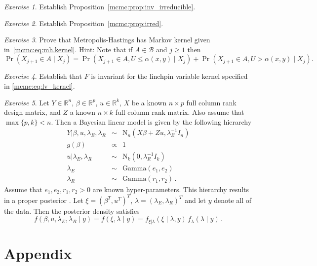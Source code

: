 \documentclass[12pt]{article}
\theoremstyle{plain}
\theoremstyle{definition}
\theoremstyle{remark}
\newtheorem{hw}{Exercise}[section]
\newcommand{\B}{\mathcal{B}}
\newcommand{\real}{\mathbb{R}}
\begin{document}
\begin{hw}
Establish Proposition~\ref{mcmc:prop:inv_irreducible}.
\end{hw}

\begin{hw}
  Establish Proposition~\ref{mcmc:prop:irred}.
\end{hw}

\begin{hw}
  Prove that Metropolis-Hastings  has Markov
  kernel given in~\eqref{mcmc:eq:mh.kernel}.  Hint: Note that if $A \in \B$
  and $j \ge 1$ then
  \[
    \Pr( X_{j+1} \in A \mid X_j) = \Pr(X_{j+1} \in A , U \le
    \alpha(x, y) \mid X_j) +  \Pr(X_{j+1} \in A , U >
    \alpha(x, y) \mid X_j) .
    \]
  \end{hw}


  \begin{hw}
    Establish that $F$ is invariant for  the linchpin variable kernel
    specified in \eqref{mcmc:eq:lv_kernel}.
  \end{hw}

  \begin{hw}
    Let $Y \in \real^n$, $\beta \in \real^p$, 
$u \in \real^k$, $X$ be a known $n \times p$ full column rank design matrix, and $Z$ a known $n \times k$ full column rank matrix. Also 
assume that $\max\{p, k\} <n$. Then a Bayesian
linear model is given by the following hierarchy
\begin{equation}\label{model1}
\begin{array}{rcl}
 Y|\beta, u, \lambda_E, \lambda_R & \sim & \textrm{N}_n\left(X\beta+Z u, \lambda_E^{-1}I_n\right) \\
 g(\beta)                            & \propto & 1 \\
 u|\lambda_E, \lambda_R           & \sim & \textrm{N}_k\left(0,\lambda_R^{-1}I_k\right) \\
 \lambda_E                        & \sim & \textrm{Gamma}\left(e_1, e_2\right) \\
 \lambda_R                        & \sim & \textrm{Gamma}\left(r_1,
   r_2\right) \,.
\end{array}
\end{equation}
Assume that $e_1, e_2, r_1, r_2>0$ are known hyper-parameters. This
hierarchy results in a proper posterior \cite{sun:etal:2001} . Let
$\xi = (\beta^T, u^T)^T$, $\lambda = (\lambda_E, \lambda_R)^T$ and let
$y$ denote all of the data.  Then the posterior density satisfies
% 
\begin{equation}\label{posterior-m22}
  f(\beta, u, \lambda_E, \lambda_R\mid y) = f(\xi, \lambda\mid y) =
  f_{\xi|\lambda}(\xi\mid \lambda, y) \, f_{\lambda}(\lambda\mid y)\,.
\end{equation}
    \end{hw}

\newpage

\section*{Appendix}





\end{document}
